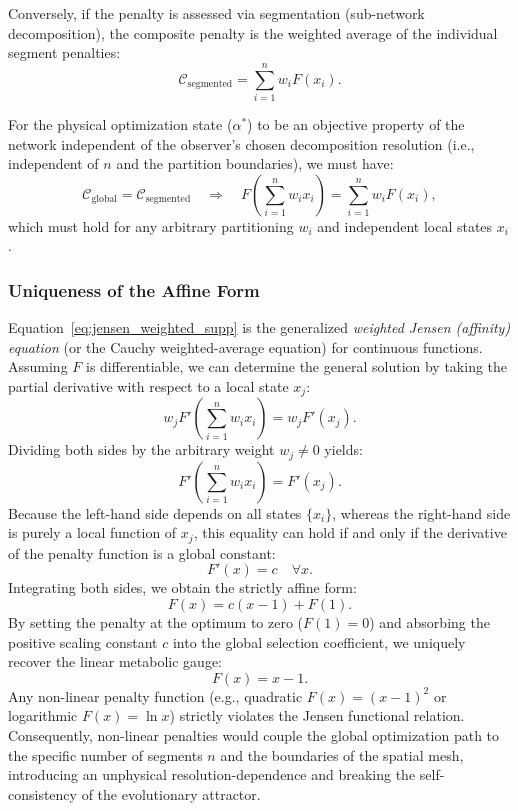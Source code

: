 \documentclass[11pt,a4paper]{article}
\theoremstyle{remark}
\begin{document}
Conversely, if the penalty is assessed via segmentation (sub-network
decomposition), the composite penalty is the weighted average of the individual
segment penalties:
\begin{equation}
    \mathcal{C}_{\mathrm{segmented}} = \sum_{i=1}^n w_i F(x_i).
\end{equation}

For the physical optimization state ($\alpha^*$) to be an objective property of
the network independent of the observer's chosen decomposition resolution (i.e.,
independent of $n$ and the partition boundaries), we must have:
\begin{equation}
    \mathcal{C}_{\mathrm{global}} = \mathcal{C}_{\mathrm{segmented}} \quad \Rightarrow \quad F\left( \sum_{i=1}^n w_i x_i \right) = \sum_{i=1}^n w_i F(x_i),
    \label{eq:jensen_weighted_supp}
\end{equation}
which must hold for any arbitrary partitioning $w_i$ and independent local
states $x_i$.

\subsubsection{Uniqueness of the Affine Form}

Equation~\eqref{eq:jensen_weighted_supp} is the generalized \emph{weighted
Jensen (affinity) equation} (or the Cauchy weighted-average equation) for
continuous functions. Assuming $F$ is differentiable, we can determine the
general solution by taking the partial derivative with respect to a local state
$x_j$:
\begin{equation}
    w_j F'\left( \sum_{i=1}^n w_i x_i \right) = w_j F'(x_j).
\end{equation}
Dividing both sides by the arbitrary weight $w_j \neq 0$ yields:
\begin{equation}
    F'\left( \sum_{i=1}^n w_i x_i \right) = F'(x_j).
\end{equation}
Because the left-hand side depends on all states $\{x_i\}$, whereas the
right-hand side is purely a local function of $x_j$, this equality can hold if
and only if the derivative of the penalty function is a global constant:
\begin{equation}
    F'(x) = c \quad \forall x.
\end{equation}
Integrating both sides, we obtain the strictly affine form:
\begin{equation}
    F(x) = c(x - 1) + F(1).
\end{equation}
By setting the penalty at the optimum to zero ($F(1) = 0$) and absorbing the
positive scaling constant $c$ into the global selection coefficient, we uniquely
recover the linear metabolic gauge:
\begin{equation}
    F(x) = x - 1.
\end{equation}
Any non-linear penalty function (e.g., quadratic $F(x) = (x-1)^2$ or logarithmic
$F(x) = \ln x$) strictly violates the Jensen functional relation. Consequently,
non-linear penalties would couple the global optimization path to the specific
number of segments $n$ and the boundaries of the spatial mesh, introducing an
unphysical resolution-dependence and breaking the self-consistency of the
evolutionary attractor.
\end{document}
